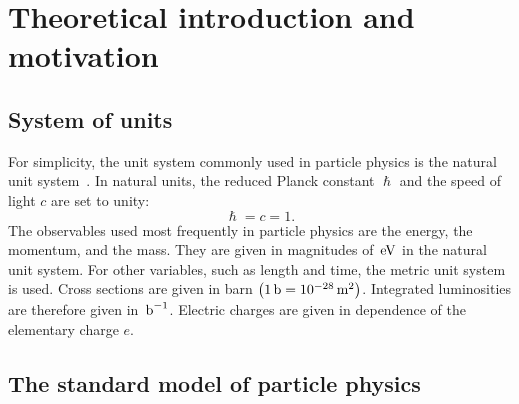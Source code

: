 \chapter{Theoretical introduction and motivation}\label{chap:introduction}
\minitoc





\section{System of units}\label{sec:units}

For simplicity, the unit system commonly used in particle physics is the natural unit system~\cite{UnitSystem}. In natural units, the reduced Planck constant $\hslash$ and the speed of light $c$ are set to unity:
\begin{equation}
 \hslash=c=1.
\end{equation}
The observables used most frequently in particle physics are the energy, the momentum, and the mass. They are given in magnitudes of $\,\text{e\hspace{-.08em}V}$ in the natural unit system. For other variables, such as length and time, the metric unit system is used. Cross sections are given in barn $\left(1\,\text{b}=10^{-28}\,\text{m}^2\right)$. Integrated luminosities are therefore given in $\mbox{\ensuremath{\,\text{b}^\text{$-$1}}}$. Electric charges are given in dependence of the elementary charge $e$.

\section{The standard model of particle physics}\label{sec:SM}

